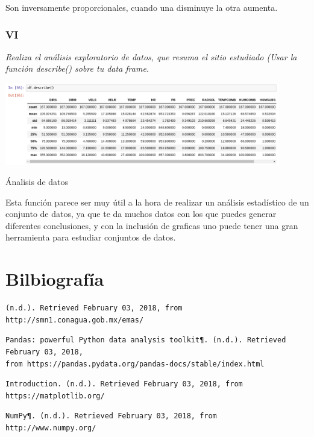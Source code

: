 \documentclass{article}
\begin{document}
Son inversamente proporcionales, cuando una disminuye la otra aumenta.

\subsubsection{VI}
\textit{Realiza el análisis exploratorio de datos, que resuma el sitio estudiado (Usar la función describe() sobre tu data frame.} 

\begin{center}
	\includegraphics[width=12cm]{Act2vi.png}
    
    Ánalisis de datos
\end{center}
\vspace{0.3cm}

Esta función parece ser muy útil a la hora de realizar un análisis estadístico de un conjunto de datos, ya que te da muchos datos con los que puedes generar diferentes conclusiones, y con la inclusión de graficas uno puede tener una gran herramienta para estudiar conjuntos de datos.

\section{Bilbiografía}

\begin{verbatim}
(n.d.). Retrieved February 03, 2018, from http://smn1.conagua.gob.mx/emas/ 
\end{verbatim}

\begin{verbatim}
Pandas: powerful Python data analysis toolkit¶. (n.d.). Retrieved February 03, 2018, 
from https://pandas.pydata.org/pandas-docs/stable/index.html 
\end{verbatim}

\begin{verbatim}
Introduction. (n.d.). Retrieved February 03, 2018, from https://matplotlib.org/ 
\end{verbatim}

\begin{verbatim}
NumPy¶. (n.d.). Retrieved February 03, 2018, from http://www.numpy.org/ 
\end{verbatim}
\end{document}
